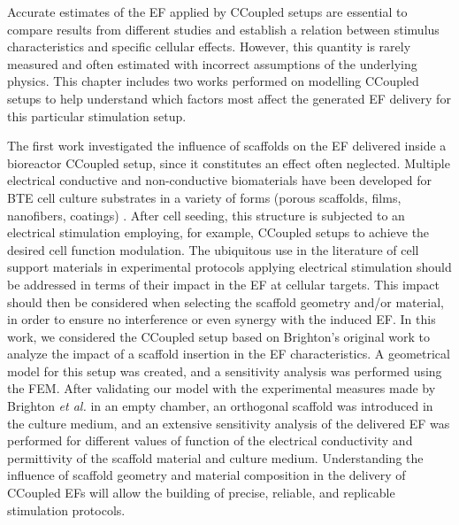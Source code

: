 Accurate estimates of the \acs{EF} applied by CCoupled setups are essential to compare results from different studies and establish a relation between stimulus characteristics and specific cellular effects. However, this quantity is rarely measured and often estimated with incorrect assumptions of the underlying physics. This chapter includes two works performed on modelling \acs{CCoupled} setups to help understand which factors most affect the generated \acs{EF} delivery for this particular stimulation setup.   

The first work investigated the influence of scaffolds on the \acs{EF} delivered inside a bioreactor \acs{CCoupled} setup, since it constitutes an effect often neglected. Multiple electrical conductive and non-conductive biomaterials have been developed for \acs{BTE} cell culture substrates in a variety of forms (porous scaffolds, films, nanofibers, coatings) \cite{Dong2020}. After cell seeding, this structure is subjected to an electrical stimulation employing, for example, \acs{CCoupled} setups to achieve the desired cell function modulation. The ubiquitous use in the literature of cell support materials in experimental protocols applying electrical stimulation should be addressed in terms of their impact in the \acs{EF} at cellular targets. This impact should then be considered when selecting the scaffold geometry and/or material, in order to ensure no interference or even synergy with the induced \acs{EF}. In this work, we considered the \acs{CCoupled} setup based on Brighton's original work \cite{Brighton1988-vc, Brighton1992-gg} to analyze the impact of a scaffold insertion in the \acs{EF} characteristics. A geometrical model for this setup was created, and a sensitivity analysis was performed using the \acs{FEM}. After validating our model with the experimental measures made by Brighton \textit{et al.} \cite{Brighton1988-vc, Brighton1992-gg} in an empty chamber, an orthogonal scaffold was introduced in the culture medium, and an extensive sensitivity analysis of the delivered \acs{EF} was performed for different values of function of the electrical conductivity and permittivity of the scaffold material and culture medium. Understanding the influence of scaffold geometry and material composition in the delivery of \acs{CCoupled} \acs{EF}s will allow the building of precise, reliable, and replicable stimulation protocols.   

